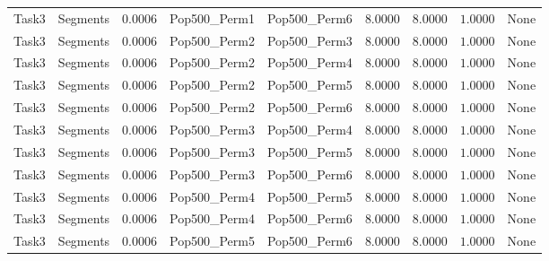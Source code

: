 \documentclass[8pt]{article}
\begin{document}
\begin{longtable}{llccccccc}
Task3 & Segments & $0.0006$ & Pop500\_Perm1 & Pop500\_Perm6 & 8.0000 & 8.0000 & $1.0000$ & None \\
Task3 & Segments & $0.0006$ & Pop500\_Perm2 & Pop500\_Perm3 & 8.0000 & 8.0000 & $1.0000$ & None \\
Task3 & Segments & $0.0006$ & Pop500\_Perm2 & Pop500\_Perm4 & 8.0000 & 8.0000 & $1.0000$ & None \\
Task3 & Segments & $0.0006$ & Pop500\_Perm2 & Pop500\_Perm5 & 8.0000 & 8.0000 & $1.0000$ & None \\
Task3 & Segments & $0.0006$ & Pop500\_Perm2 & Pop500\_Perm6 & 8.0000 & 8.0000 & $1.0000$ & None \\
Task3 & Segments & $0.0006$ & Pop500\_Perm3 & Pop500\_Perm4 & 8.0000 & 8.0000 & $1.0000$ & None \\
Task3 & Segments & $0.0006$ & Pop500\_Perm3 & Pop500\_Perm5 & 8.0000 & 8.0000 & $1.0000$ & None \\
Task3 & Segments & $0.0006$ & Pop500\_Perm3 & Pop500\_Perm6 & 8.0000 & 8.0000 & $1.0000$ & None \\
Task3 & Segments & $0.0006$ & Pop500\_Perm4 & Pop500\_Perm5 & 8.0000 & 8.0000 & $1.0000$ & None \\
Task3 & Segments & $0.0006$ & Pop500\_Perm4 & Pop500\_Perm6 & 8.0000 & 8.0000 & $1.0000$ & None \\
Task3 & Segments & $0.0006$ & Pop500\_Perm5 & Pop500\_Perm6 & 8.0000 & 8.0000 & $1.0000$ & None \\
\end{longtable}
\end{document}
